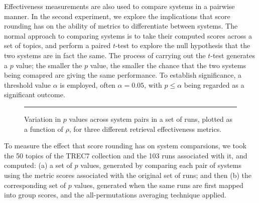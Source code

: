 
Effectiveness measurements are also used to compare systems in a
pairwise manner.
In the second experiment, we explore the implications that score
rounding has on the ability of metrics to differentiate between
systems.
The normal approach to comparing systems is to take their computed
scores across a set of topics, and perform a paired $t$-test to
explore the null hypothesis that the two systems are in fact the
same.
The process of carrying out the $t$-test generates a $p$ value; the
smaller the $p$ value, the smaller the chance that the two systems
being comapred are giving the same performance.
To establish significance, a threshold value $\alpha$ is employed,
often $\alpha=0.05$, with $p\le\alpha$ being regarded as a
significant outcome.

\begin{figure}[t]
\centering
\rule{0.5mm}{45mm}
\caption{Variation in $p$ values across system pairs in a set
of runs, plotted as a function of $\rho$, for three different
retrieval effectiveness metrics.
{}
{}
{}
{}
\label{fig-pair-variation}}
\end{figure}

To measure the effect that score rounding has on system comparsions,
we took the 50 topics of the TREC7 {} collection
and the 103 runs associated with it, and computed: (a) a set
of $p$ values, generated by comparing each pair of systems using the
metric scores associated with the original set of runs; and then (b)
the corresponding set of $p$ values, generated when the same runs are
first mapped into group scores, and the all-permutations averaging
technique applied.

